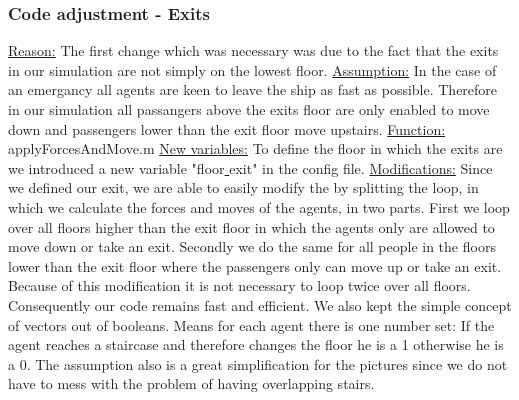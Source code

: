\documentclass[11pt]{article}
\begin{document}
\subsubsection{Code adjustment - Exits}
\underline{Reason:}
\newline
The first change which was necessary was due to the fact that the exits in our simulation are not simply on the lowest floor.
\newline
\underline{Assumption:}
\newline
In the case of an emergancy all agents are keen to leave the ship as fast as possible. Therefore in our simulation all passangers above the exits floor are only enabled to move down and passengers lower than the exit floor move upstairs.
\newline
\underline{Function:}
\newline
applyForcesAndMove.m
\newline
\underline{New variables:}
\newline 
To define the floor in which the exits are we introduced a new variable "floor\underline{ }exit" in the config file.
\newline
\underline{Modifications:}
\newline
Since we defined our exit, we are able to easily modify the by splitting the loop, in which we calculate the forces and moves of the agents, in two parts. First we loop over all floors higher than the exit floor in which the agents only are allowed to move down or take an exit. Secondly we do the same for all people in the floors lower than the exit floor where the passengers only can move up or take an exit.
\newline
Because of this modification it is not necessary to loop twice over all floors. Consequently our code remains fast and efficient. We also kept the simple concept of vectors out of booleans. Means for each agent there is one number set: If the agent reaches a staircase and therefore changes the floor he is a 1 otherwise he is a 0. The assumption also is a great simplification for the pictures since we do not have to mess with the problem of having overlapping stairs.
\end{document}
